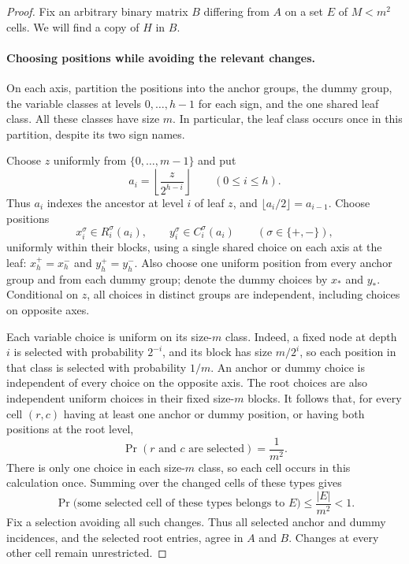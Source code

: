 \begin{proof}
Fix an arbitrary binary matrix $B$ differing from $A$ on a set $E$ of
$M<m^2$ cells.  We will find a copy of $H$ in $B$.

\paragraph{Choosing positions while avoiding the relevant changes.}
On each axis, partition the positions into the anchor groups, the dummy
group, the variable classes at levels $0,\ldots,h-1$ for each sign, and
the one shared leaf class.  All these classes have size $m$.  In
particular, the leaf class occurs once in this partition, despite its
two sign names.

Choose $z$ uniformly from $\{0,\ldots,m-1\}$ and put
\[
 a_i=\left\lfloor\frac{z}{2^{h-i}}\right\rfloor
 \qquad(0\leq i\leq h).
\]
Thus $a_i$ indexes the ancestor at level $i$ of leaf $z$, and
$\lfloor a_i/2\rfloor=a_{i-1}$.  Choose positions
\[
 x_i^\sigma\in R_i^\sigma(a_i),\qquad
 y_i^\sigma\in C_i^\sigma(a_i)
 \qquad(\sigma\in\{+,-\}),
\]
uniformly within their blocks, using a single shared choice on each axis
at the leaf:
$x_h^+=x_h^-$ and $y_h^+=y_h^-$.  Also choose one uniform position from
every anchor group and from each dummy group; denote the dummy choices
by $x_*$ and $y_*$.  Conditional on $z$, all choices in distinct groups
are independent, including choices on opposite axes.

Each variable choice is uniform on its size-$m$ class.  Indeed, a fixed
node at depth $i$ is selected with probability $2^{-i}$, and its block
has size $m/2^i$, so each position in that class is selected with
probability $1/m$.  An anchor or dummy choice is independent of every
choice on the opposite axis.  The root choices are also independent
uniform choices in their fixed size-$m$ blocks.  It follows that, for
every cell $(r,c)$ having at least one anchor or dummy position, or
having both positions at the root level,
\[
 \Pr(r\text{ and }c\text{ are selected})=\frac1{m^2}.
\]
There is only one choice in each size-$m$ class, so each cell occurs in
this calculation once.  Summing over the changed cells of these types
gives
\begin{equation}\label{eq:cellwise-bound}
 \Pr\bigl(\text{some selected cell of these types belongs to }E\bigr)
 \leq\frac{|E|}{m^2}<1.
\end{equation}
Fix a selection avoiding all such changes.  Thus all selected anchor
and dummy incidences, and the selected root entries, agree in $A$ and
$B$.  Changes at every other cell remain unrestricted.


\end{proof}
